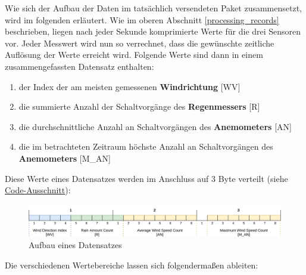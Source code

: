 \documentclass[12pt]{article}
\begin{document}
      Wie sich der Aufbau der Daten im tatsächlich versendeten Paket zusammensetzt, wird im folgenden erläutert.
      Wie im oberen Abschnitt \underline{\ref{processing_records}} beschrieben, liegen nach jeder Sekunde komprimierte Werte für die drei Sensoren vor.
      Jeder Messwert wird nun so verrechnet, dass die gewünschte zeitliche Auflösung der Werte erreicht wird.
      Folgende Werte sind dann in einem zusammengefassten Datensatz enthalten:

      \begin{enumerate}
        \item der Index der am meisten gemessenen \textbf{Windrichtung} [WV]
        \item die summierte Anzahl der Schaltvorgänge des \textbf{Regenmessers} [R]
        \item die durchschnittliche Anzahl an Schaltvorgängen des \textbf{Anemometers} [AN]
        \item die im betrachteten Zeitraum höchste Anzahl an Schaltvorgängen des \textbf{Anemometers} [M\_AN]
      \end{enumerate}

      Diese Werte eines Datensatzes werden im Anschluss auf 3 Byte verteilt (siehe \href{https://github.com/HTWDD-RN/ps21-LoRa/blob/9c012bc1d41e960b6edf9e756e8948e387f28c83/src/lora_weather_station/lora_weather_station.ino#L120}{Code-Ausschnitt}):

      \begin{figure}[H]
        \centering
        \includegraphics[scale=0.12]{Record_Byte_Representation.png}
        \caption{Aufbau eines Datensatzes}
      \end{figure}

      Die verschiedenen Wertebereiche lassen sich folgendermaßen ableiten:
\end{document}
